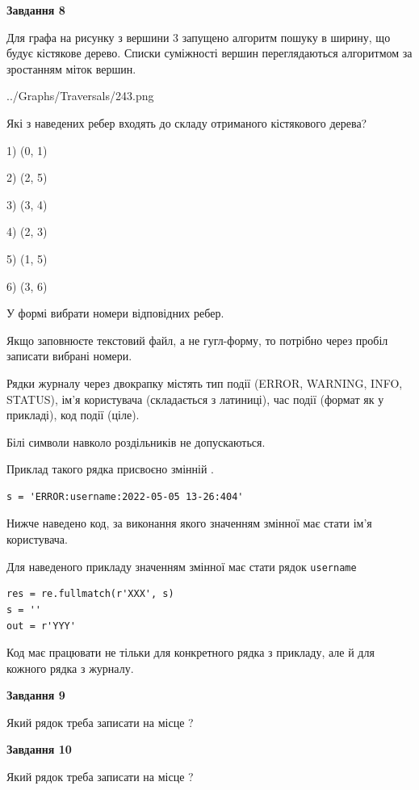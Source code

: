 \documentclass[12pt, ukrainian]{article}
\def\code#1{\Verb!#1!}
\begin{document}
{\begin {large}
{\begin {center}\textbf{Завдання 8}\end {center}}\par
Для графа на рисунку з вершини 3 запущено алгоритм пошуку в ширину, що будує кістякове дерево. Списки суміжності вершин переглядаються алгоритмом за зростанням міток вершин.\par
\begin{center}
	{../Graphs/Traversals/243.png}
\end{center}
\par Які з наведених ребер входять до складу отриманого кістякового дерева?\par
1) (0, 1)\par
2) (2, 5)\par
3) (3, 4)\par
4) (2, 3)\par
5) (1, 5)\par
6) (3, 6)\par
{\vskip 15pt} У формі вибрати номери відповідних ребер.


Якщо заповнюєте текстовий файл, а не гугл-форму, то потрібно через пробіл записа\-ти вибрані номери.\par
\newpage


Рядки журналу через двокрапку містять тип події (ERROR, WARNING, INFO, STATUS), ім'я користувача (складається з латиниці), час події (фор\-мат як у прикладі), код події (ціле).

Білі символи навколо роздільників не допускаються.

Приклад такого рядка присвоєно змінній .



\begin{verbatim}
s = 'ERROR:username:2022-05-05 13-26:404'
\end{verbatim}


Нижче наведено код, за виконання якого значенням змінної  має стати ім'я користувача.

Для наведеного прикладу значенням змінної  має стати рядок \code{username}



\begin{verbatim}
res = re.fullmatch(r'XXX', s)
s = ''
out = r'YYY'
\end{verbatim}


Код має працювати не тільки для конкретного рядка з прикладу, але й для кожного рядка з журналу.

{\begin {center}\textbf{Завдання 9}\end {center}}\par
Який рядок треба записати на місце  ?\par
\vspace{5mm}


{\begin {center}\textbf{Завдання 10}\end {center}}\par
Який рядок треба записати на місце  ?\par


\newpage


\end {large}}
\end{document}
